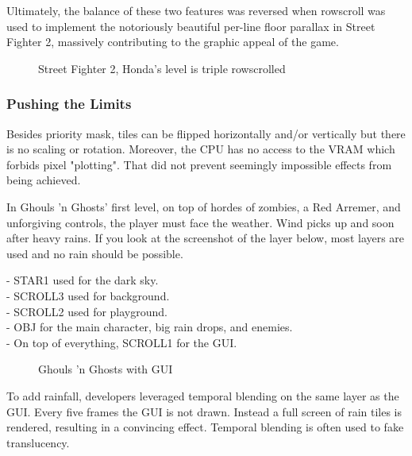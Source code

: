 Ultimately, the balance of these two features was reversed when rowscroll was used to implement the notoriously beautiful per-line floor parallax in Street Fighter 2, massively contributing to the graphic appeal of the game.


\vfill
\begin{figure}[!b]
 \caption*{Street Fighter 2, Honda's level is triple rowscrolled}%
 \end{figure}%
\pagebreak







\subsubsection{Pushing the Limits}

Besides priority mask, tiles can be flipped horizontally and/or vertically but there is no scaling or rotation. Moreover, the CPU has no access to the VRAM which forbids pixel "plotting". That did not prevent seemingly impossible effects from being achieved.



In Ghouls 'n Ghosts' first level, on top of hordes of zombies, a Red Arremer, and unforgiving controls, the player must face the weather. Wind picks up and soon after heavy rains. If you look at the screenshot of the layer below, most layers are used and no rain should be possible.

-  STAR1 used for the dark sky.\\
-  SCROLL3 used for background.\\
-  SCROLL2 used for playground.\\
-  OBJ for the main character, big rain drops, and enemies.\\
-  On top of everything, SCROLL1 for the GUI.\\



\vfill
\begin{figure}[!b]
 \caption*{Ghouls 'n Ghosts with GUI}%
 \end{figure}%
\pagebreak

To add rainfall, developers leveraged temporal blending on the same layer as the GUI.\label{gg_rain} Every five frames the GUI is not drawn. Instead a full screen of rain tiles is rendered, resulting in a convincing effect. Temporal blending is often used to fake translucency. 

